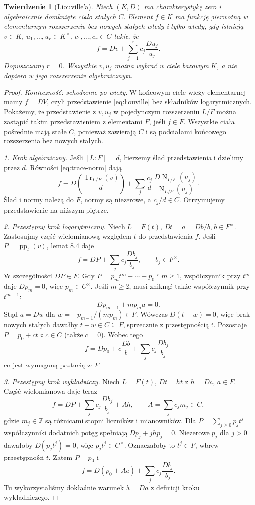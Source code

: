 \documentclass[11pt,a4paper,oneside]{book}
\numberwithin{equation}{section}
\theoremstyle{plain}
\newtheorem{twierdzenie}{Twierdzenie}[chapter]
\theoremstyle{definition}
\theoremstyle{remark}
\newcommand{\Z}{\mathbb{Z}}
\newcommand{\Tr}{\operatorname{Tr}}
\newcommand{\Nm}{\operatorname{N}}
\begin{document}
\begin{twierdzenie}[Liouville'a]
Niech $(K,D)$ ma charakterystykę zero i algebraicznie domknięte ciało stałych $C$. Element $f\in K$ ma funkcję pierwotną w elementarnym rozszerzeniu bez nowych stałych wtedy i tylko wtedy, gdy istnieją $v\in K$, $u_1,\dots,u_r\in K^\times$, $c_1,\dots,c_r\in C$ takie, że
\begin{equation}\label{eq:liouville}
f=Dv+\sum_{j=1}^r c_j\frac{Du_j}{u_j}.
\end{equation}
Dopuszczamy $r=0$. Wszystkie $v,u_j$ można wybrać w ciele bazowym $K$, a nie dopiero w jego rozszerzeniu algebraicznym.
\end{twierdzenie}
\begin{proof}
\emph{Konieczność: schodzenie po wieży.} W końcowym ciele wieży elementarnej mamy $f=DV$, czyli przedstawienie \eqref{eq:liouville} bez składników logarytmicznych. Pokażemy, że przedstawienie z $v,u_j$ w pojedynczym rozszerzeniu $L/F$ można zastąpić takim przedstawieniem z elementami $F$, jeśli $f\in F$. Wszystkie ciała pośrednie mają stałe $C$, ponieważ zawierają $C$ i są podciałami końcowego rozszerzenia bez nowych stałych.

\emph{1. Krok algebraiczny.} Jeśli $[L:F]=d$, bierzemy ślad przedstawienia i dzielimy przez $d$. Równości \eqref{eq:trace-norm} dają
\[
f=D\left(\frac{\Tr_{L/F}(v)}{d}\right)
+\sum_j\frac{c_j}{d}\,
\frac{D\Nm_{L/F}(u_j)}{\Nm_{L/F}(u_j)}.
\]
Ślad i normy należą do $F$, normy są niezerowe, a $c_j/d\in C$. Otrzymujemy przedstawienie na niższym piętrze.

\emph{2. Przestępny krok logarytmiczny.} Niech $L=F(t)$, $Dt=a=Db/b$, $b\in F^\times$. Zastosujmy część wielomianową względem $t$ do przedstawienia $f$. Jeśli $P=\operatorname{pp}_t(v)$, lemat 8.4 daje
\[
f=DP+\sum_j c_j\frac{Db_j}{b_j},\qquad b_j\in F^\times.
\]
W szczególności $DP\in F$. Gdy $P=p_mt^m+\cdots+p_0$ i $m\ge1$, współczynnik przy $t^m$ daje $Dp_m=0$, więc $p_m\in C^\times$. Jeśli $m\ge2$, musi zniknąć także współczynnik przy $t^{m-1}$:
\[
Dp_{m-1}+m p_ma=0.
\]
Stąd $a=Dw$ dla $w=-p_{m-1}/(mp_m)\in F$. Wówczas $D(t-w)=0$, więc brak nowych stałych dawałby $t-w\in C\subseteq F$, sprzecznie z przestępnością $t$. Pozostaje $P=p_0+ct$ z $c\in C$ (także $c=0$). Wobec tego
\[
f=Dp_0+c\frac{Db}{b}+\sum_j c_j\frac{Db_j}{b_j},
\]
co jest wymaganą postacią w $F$.

\emph{3. Przestępny krok wykładniczy.} Niech $L=F(t)$, $Dt=ht$ z $h=Da$, $a\in F$. Część wielomianowa daje teraz
\[
f=DP+\sum_j c_j\frac{Db_j}{b_j}+Ah,\qquad A=\sum_j c_jm_j\in C,
\]
gdzie $m_j\in\Z$ są różnicami stopni liczników i mianowników. Dla $P=\sum_{j\ge0}p_jt^j$ współczynniki dodatnich potęg spełniają $Dp_j+jhp_j=0$. Niezerowe $p_j$ dla $j>0$ dawałoby $D(p_jt^j)=0$, więc $p_jt^j\in C^\times$. Oznaczałoby to $t^j\in F$, wbrew przestępności $t$. Zatem $P=p_0$ i
\[
f=D(p_0+Aa)+\sum_j c_j\frac{Db_j}{b_j}.
\]
Tu wykorzystaliśmy dokładnie warunek $h=Da$ z definicji kroku wykładniczego.


\end{proof}
\end{document}
